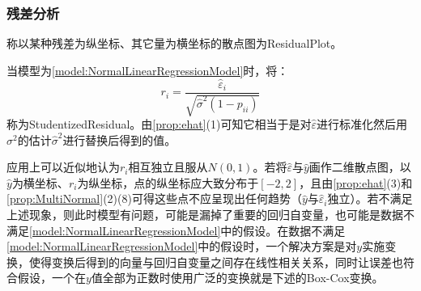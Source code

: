 \subsubsection{残差分析}
\begin{definition}
	称以某种残差为纵坐标、其它量为横坐标的散点图为\gls{ResidualPlot}。
\end{definition}
\begin{definition}
	当模型为\cref{model:NormalLinearRegressionModel}时，将：
	\begin{equation*}
		r_i=\frac{\hat{\varepsilon}_i}{\sqrt{\hat{\sigma}^2(1-p_{ii})}}
	\end{equation*}
	称为\gls{StudentizedResidual}。由\cref{prop:ehat}(1)可知它相当于是对$\hat{\varepsilon}$进行标准化然后用$\sigma^2$的估计$\hat{\sigma}^2$进行替换后得到的值。
\end{definition}
\begin{note}
	应用上可以近似地认为$r_i$相互独立且服从$N(0,1)$。若将$\hat{\varepsilon}$与$\hat{y}$画作二维散点图，以$\hat{y}$为横坐标、$r_i$为纵坐标，点的纵坐标应大致分布于$[-2,2]$，且由\cref{prop:ehat}(3)和\cref{prop:MultiNormal}(2)(8)可得这些点不应呈现出任何趋势（$\hat{y}$与$\hat{\varepsilon}_i$独立）。若不满足上述现象，则此时模型有问题，可能是漏掉了重要的回归自变量，也可能是数据不满足\cref{model:NormalLinearRegressionModel}中的假设。在数据不满足\cref{model:NormalLinearRegressionModel}中的假设时，一个解决方案是对$y$实施变换，使得变换后得到的向量与回归自变量之间存在线性相关关系，同时让误差也符合假设，一个在$y$值全部为正数时使用广泛的变换就是下述的Box-Cox变换。
\end{note}
